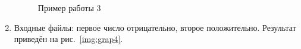 \documentclass[12pt, a4paper]{article}
\begin{document}
\begin{enumerate}
\begin{figure}[h]
  		\caption{Пример работы 3}
  		\label{img:grap3}
	\end{figure}
	\item Входные файлы: первое число отрицательно, второе положительно.
	Результат приведён на рис.~\ref{img:grap4}.
	\begin{figure}[h]

\end{figure}
\end{enumerate}
\end{document}
